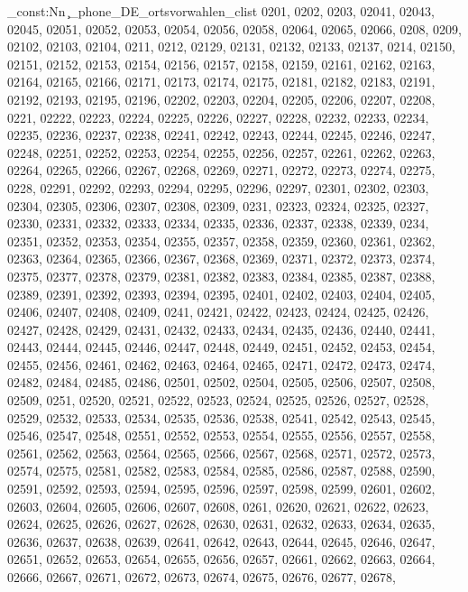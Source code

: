 \clist_const:Nn \c_phone_DE_ortsvorwahlen_clist {0201,
0202,
0203,
02041,
02043,
02045,
02051,
02052,
02053,
02054,
02056,
02058,
02064,
02065,
02066,
0208,
0209,
02102,
02103,
02104,
0211,
0212,
02129,
02131,
02132,
02133,
02137,
0214,
02150,
02151,
02152,
02153,
02154,
02156,
02157,
02158,
02159,
02161,
02162,
02163,
02164,
02165,
02166,
02171,
02173,
02174,
02175,
02181,
02182,
02183,
02191,
02192,
02193,
02195,
02196,
02202,
02203,
02204,
02205,
02206,
02207,
02208,
0221,
02222,
02223,
02224,
02225,
02226,
02227,
02228,
02232,
02233,
02234,
02235,
02236,
02237,
02238,
02241,
02242,
02243,
02244,
02245,
02246,
02247,
02248,
02251,
02252,
02253,
02254,
02255,
02256,
02257,
02261,
02262,
02263,
02264,
02265,
02266,
02267,
02268,
02269,
02271,
02272,
02273,
02274,
02275,
0228,
02291,
02292,
02293,
02294,
02295,
02296,
02297,
02301,
02302,
02303,
02304,
02305,
02306,
02307,
02308,
02309,
0231,
02323,
02324,
02325,
02327,
02330,
02331,
02332,
02333,
02334,
02335,
02336,
02337,
02338,
02339,
0234,
02351,
02352,
02353,
02354,
02355,
02357,
02358,
02359,
02360,
02361,
02362,
02363,
02364,
02365,
02366,
02367,
02368,
02369,
02371,
02372,
02373,
02374,
02375,
02377,
02378,
02379,
02381,
02382,
02383,
02384,
02385,
02387,
02388,
02389,
02391,
02392,
02393,
02394,
02395,
02401,
02402,
02403,
02404,
02405,
02406,
02407,
02408,
02409,
0241,
02421,
02422,
02423,
02424,
02425,
02426,
02427,
02428,
02429,
02431,
02432,
02433,
02434,
02435,
02436,
02440,
02441,
02443,
02444,
02445,
02446,
02447,
02448,
02449,
02451,
02452,
02453,
02454,
02455,
02456,
02461,
02462,
02463,
02464,
02465,
02471,
02472,
02473,
02474,
02482,
02484,
02485,
02486,
02501,
02502,
02504,
02505,
02506,
02507,
02508,
02509,
0251,
02520,
02521,
02522,
02523,
02524,
02525,
02526,
02527,
02528,
02529,
02532,
02533,
02534,
02535,
02536,
02538,
02541,
02542,
02543,
02545,
02546,
02547,
02548,
02551,
02552,
02553,
02554,
02555,
02556,
02557,
02558,
02561,
02562,
02563,
02564,
02565,
02566,
02567,
02568,
02571,
02572,
02573,
02574,
02575,
02581,
02582,
02583,
02584,
02585,
02586,
02587,
02588,
02590,
02591,
02592,
02593,
02594,
02595,
02596,
02597,
02598,
02599,
02601,
02602,
02603,
02604,
02605,
02606,
02607,
02608,
0261,
02620,
02621,
02622,
02623,
02624,
02625,
02626,
02627,
02628,
02630,
02631,
02632,
02633,
02634,
02635,
02636,
02637,
02638,
02639,
02641,
02642,
02643,
02644,
02645,
02646,
02647,
02651,
02652,
02653,
02654,
02655,
02656,
02657,
02661,
02662,
02663,
02664,
02666,
02667,
02671,
02672,
02673,
02674,
02675,
02676,
02677,
02678,
}
